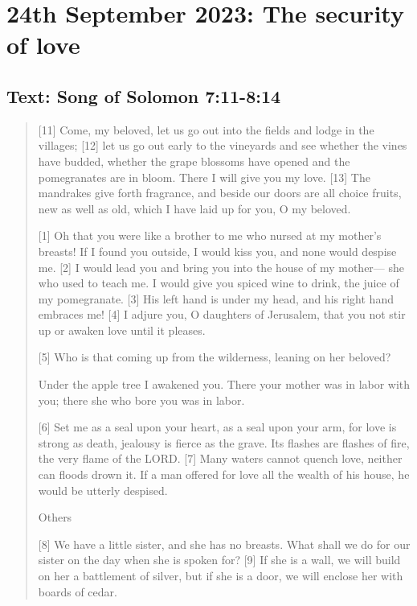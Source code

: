 \setcounter{figure}{0}

\section{24th September 2023: The security of love}
\subsection*{Text: Song of Solomon 7:11-8:14}
  \begin{quote}
    [11] Come, my beloved,
        let us go out into the fields
        and lodge in the villages;
    [12] let us go out early to the vineyards
        and see whether the vines have budded,
    whether the grape blossoms have opened
        and the pomegranates are in bloom.
    There I will give you my love.
    [13] The mandrakes give forth fragrance,
        and beside our doors are all choice fruits,
    new as well as old,
        which I have laid up for you, O my beloved.


    [1] Oh that you were like a brother to me
        who nursed at my mother’s breasts!
    If I found you outside, I would kiss you,
        and none would despise me.
    [2] I would lead you and bring you
        into the house of my mother—
        she who used to teach me.
    I would give you spiced wine to drink,
        the juice of my pomegranate.
    [3] His left hand is under my head,
        and his right hand embraces me!
    [4] I adjure you, O daughters of Jerusalem,
        that you not stir up or awaken love
        until it pleases.


    [5] Who is that coming up from the wilderness,
        leaning on her beloved?


    Under the apple tree I awakened you.
    There your mother was in labor with you;
        there she who bore you was in labor.


    [6] Set me as a seal upon your heart,
        as a seal upon your arm,
    for love is strong as death,
        jealousy is fierce as the grave.
    Its flashes are flashes of fire,
        the very flame of the LORD.
    [7] Many waters cannot quench love,
        neither can floods drown it.
    If a man offered for love
        all the wealth of his house,
        he would be utterly despised.


        Others

    [8] We have a little sister,
        and she has no breasts.
    What shall we do for our sister
        on the day when she is spoken for?
    [9] If she is a wall,
        we will build on her a battlement of silver,
    but if she is a door,
        we will enclose her with boards of cedar.



\end{quote}
